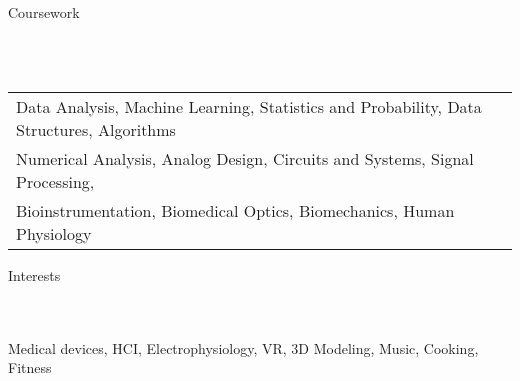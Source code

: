 \documentclass{article}
\newcommand{\lineunder} {
    \vspace*{-8pt} \\
    \hspace*{-18pt} \hrulefill \\
}
\newcommand{\header} [1] {
    {\hspace*{-18pt}\vspace*{6pt} \Large{#1} }
    \vspace*{-6pt} 
    \lineunder
}
\begin{document}
%

\header{Coursework}
\vspace{1mm}
\begin{tabular}{ l l }
	Data Analysis, Machine Learning, Statistics and Probability, Data Structures, Algorithms \\
	Numerical Analysis, Analog Design, Circuits and Systems, Signal Processing, \\
	Bioinstrumentation, Biomedical Optics, Biomechanics, Human Physiology
\end{tabular}

\header{Interests}
Medical devices, HCI, Electrophysiology, VR, 3D Modeling, Music, Cooking, Fitness
\end{document}
